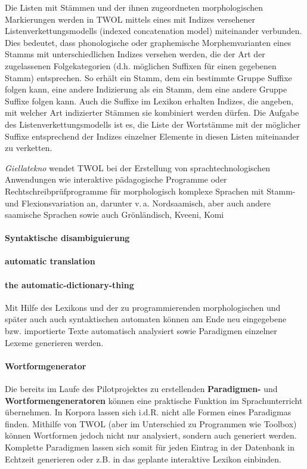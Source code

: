 \documentclass[a4paper,12pt]{article}
\begin{document}
Die Listen mit Stämmen und der ihnen zugeordneten morphologischen Markierungen werden in TWOL mittels eines mit Indizes versehener Listenverkettungsmodells (indexed concatenation model) miteinander verbunden. Dies bedeutet, dass phonologische oder graphemische Morphemvarianten eines Stamms mit unterschiedlichen Indizes versehen werden, die der Art der zugelassenen Folgekategorien (d.h. möglichen Suffixen für einen gegebenen Stamm) entsprechen. So erhält ein Stamm, dem ein bestimmte Gruppe Suffixe folgen kann, eine andere Indizierung als ein Stamm, dem eine andere Gruppe Suffixe folgen kann. Auch die Suffixe im Lexikon erhalten Indizes, die angeben, mit welcher Art indizierter Stämmen sie kombiniert werden dürfen. Die Aufgabe des Listenverkettungsmodells ist es, die Liste der Wortstämme mit der möglicher Suffixe entsprechend der Indizes einzelner Elemente in diesen Listen miteinander zu verketten.

\textit{Giellatekno} wendet TWOL bei der Erstellung von sprachtechnologischen Anwendungen wie interaktive pädagogische Programme oder Rechtschreibprüfprogramme für morphologisch komplexe Sprachen mit Stamm- und Flexionsvariation an, darunter v.\,a. Nordsaamisch, aber auch andere saamische Sprachen sowie auch Grönländisch, Kveeni, Komi

\paragraph{Syntaktische disambiguierung}

\paragraph{automatic translation} 

\paragraph{the automatic-dictionary-thing} Mit Hilfe des Lexikons und der zu programmierenden morphologischen und später auch auch syntaktischen automaten können am Ende neu eingegebene bzw. importierte Texte automatisch analysiert sowie Paradigmen einzelner Lexeme generieren werden.

\paragraph{Wortformgenerator} Die bereits im Laufe des Pilotprojektes zu erstellenden \textbf{Paradigmen-} und \textbf{Wortformengeneratoren} können eine praktische Funktion im Sprachunterricht übernehmen. In Korpora lassen sich i.d.R. nicht alle Formen eines Paradigmas finden. Mithilfe von TWOL (aber im Unterschied zu Programmen wie Toolbox) können Wortformen jedoch nicht nur analysiert, sondern auch generiert werden. Komplette Paradigmen lassen sich somit für jeden Eintrag in der Datenbank in Echtzeit generieren oder z.B. in das geplante interaktive Lexikon einbinden.
\end{document}
